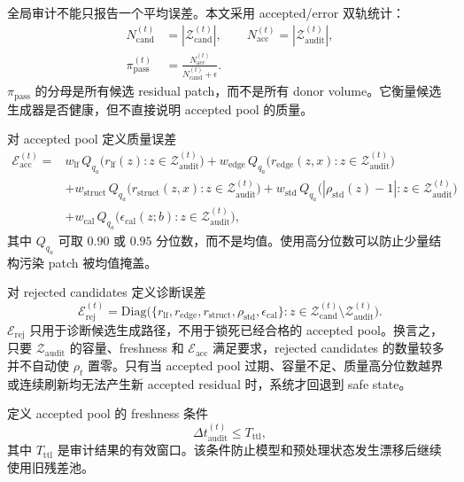 \documentclass[11pt,a4paper,UTF8,fontset=fandol]{ctexart}
\theoremstyle{definition}
\newcommand{\cZ}{\mathcal{Z}}
\begin{document}
全局审计不能只报告一个平均误差。本文采用 accepted/error 双轨统计：
\begin{align}
    N_{\mathrm{cand}}^{(t)}&=|\cZ_{\mathrm{cand}}^{(t)}|,\qquad
    N_{\mathrm{acc}}^{(t)}=|\cZ_{\mathrm{audit}}^{(t)}|,\\
    \pi_{\mathrm{pass}}^{(t)}&=\frac{N_{\mathrm{acc}}^{(t)}}{N_{\mathrm{cand}}^{(t)}+\epsilon}.
\end{align}
$\pi_{\mathrm{pass}}$ 的分母是所有候选 residual patch，而不是所有 donor volume。它衡量候选生成器是否健康，但不直接说明 accepted pool 的质量。

对 accepted pool 定义质量误差
\begin{equation}
\label{eq:eacc-auditB}
\begin{aligned}
    \mathcal E_{\mathrm{acc}}^{(t)}
    ={}&w_{\mathrm{lf}}\,Q_{q_a}\big(r_{\mathrm{lf}}(z):z\in\cZ_{\mathrm{audit}}^{(t)}\big)
    +w_{\mathrm{edge}}\,Q_{q_a}\big(r_{\mathrm{edge}}(z,x):z\in\cZ_{\mathrm{audit}}^{(t)}\big)\\
    &+w_{\mathrm{struct}}\,Q_{q_a}\big(r_{\mathrm{struct}}(z,x):z\in\cZ_{\mathrm{audit}}^{(t)}\big)
    +w_{\mathrm{std}}\,Q_{q_a}\big(|\rho_{\mathrm{std}}(z)-1|:z\in\cZ_{\mathrm{audit}}^{(t)}\big)\\
    &+w_{\mathrm{cal}}\,Q_{q_a}\big(\epsilon_{\mathrm{cal}}(z;b):z\in\cZ_{\mathrm{audit}}^{(t)}\big),
\end{aligned}
\end{equation}
其中 $Q_{q_a}$ 可取 $0.90$ 或 $0.95$ 分位数，而不是均值。使用高分位数可以防止少量结构污染 patch 被均值掩盖。

对 rejected candidates 定义诊断误差
\begin{equation}
\label{eq:erej-auditB}
    \mathcal E_{\mathrm{rej}}^{(t)}
    =\mathrm{Diag}\Big(\{r_{\mathrm{lf}},r_{\mathrm{edge}},r_{\mathrm{struct}},\rho_{\mathrm{std}},\epsilon_{\mathrm{cal}}\}:z\in\cZ_{\mathrm{cand}}^{(t)}\setminus\cZ_{\mathrm{audit}}^{(t)}\Big).
\end{equation}
$\mathcal E_{\mathrm{rej}}$ 只用于诊断候选生成路径，不用于锁死已经合格的 accepted pool。换言之，只要 $\cZ_{\mathrm{audit}}$ 的容量、freshness 和 $\mathcal E_{\mathrm{acc}}$ 满足要求，rejected candidates 的数量较多并不自动使 $\rho_t$ 置零。只有当 accepted pool 过期、容量不足、质量高分位数越界或连续刷新均无法产生新 accepted residual 时，系统才回退到 safe state。

定义 accepted pool 的 freshness 条件
\begin{equation}
    \Delta t_{\mathrm{audit}}^{(t)}\le T_{\mathrm{ttl}},
\end{equation}
其中 $T_{\mathrm{ttl}}$ 是审计结果的有效窗口。该条件防止模型和预处理状态发生漂移后继续使用旧残差池。
\end{document}
